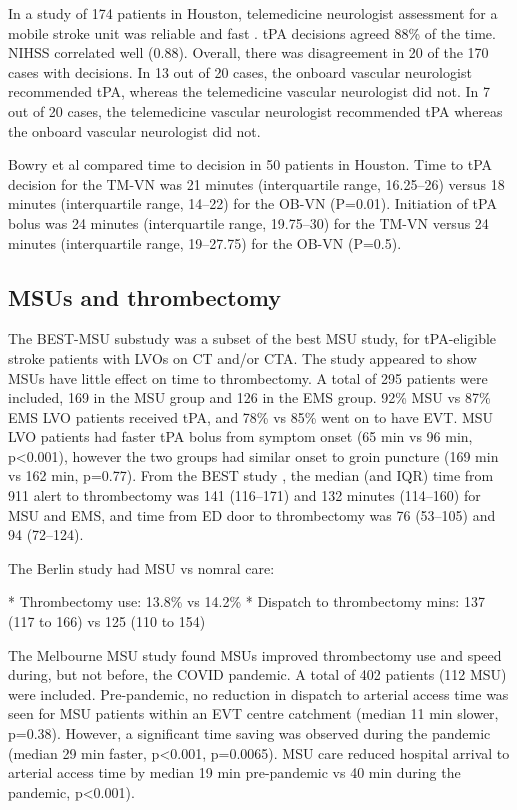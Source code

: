 In a study of 174 patients in Houston, telemedicine neurologist assessment for a mobile stroke unit was reliable and fast \cite{wu_telemedicine_2017} . tPA decisions agreed 88\% of the time. NIHSS correlated well (0.88). Overall, there was disagreement in 20 of the 170 cases with decisions. In 13 out of 20 cases, the onboard vascular neurologist recommended tPA, whereas the telemedicine vascular neurologist did not. In 7 out of 20 cases, the telemedicine vascular neurologist recommended tPA whereas the onboard vascular neurologist did not. 

Bowry et al \cite{bowry_time_2018} compared time to decision in 50 patients in Houston. Time to tPA decision for the TM-VN was 21 minutes (interquartile range, 16.25–26) versus 18 minutes (interquartile range, 14–22) for the OB-VN (P=0.01). Initiation of tPA bolus was 24 minutes (interquartile range, 19.75–30) for the TM-VN versus 24 minutes (interquartile range, 19–27.75) for the OB-VN (P=0.5).


\subsection{MSUs and thrombectomy}

The BEST-MSU substudy \cite{czap_abstract_2022} was a subset of the best MSU study, for tPA-eligible stroke patients with LVOs on CT and/or CTA. The study appeared to show MSUs have little effect on time to thrombectomy. A total of 295 patients were included, 169 in the MSU group and 126 in the EMS group. 92\% MSU vs 87\% EMS LVO patients received tPA, and 78\% vs 85\% went on to have EVT. MSU LVO patients had faster tPA bolus from symptom onset (65 min vs 96 min, p<0.001), however the two groups had similar onset to groin puncture (169 min vs 162 min, p=0.77). From the BEST study \cite{grotta_prospective_2021}, the median (and IQR) time from 911 alert to  thrombectomy was 141 (116–171) and 132 minutes (114–160) for MSU and EMS, and  time from ED door to thrombectomy was 76 (53–105) and 94 (72–124).

The Berlin study \cite{ebinger_association_2021} had MSU vs nomral care:

* Thrombectomy use: 13.8\% vs 14.2\%
* Dispatch to thrombectomy mins: 137 (117 to 166) vs 125 (110 to 154)


The Melbourne MSU study \cite{menezes_abstract_2023} found MSUs improved thrombectomy use and speed during, but not before, the COVID pandemic. A total of 402 patients (112 MSU) were included. Pre-pandemic, no reduction in dispatch to arterial access time was seen for MSU patients within an EVT centre catchment (median 11 min slower, p=0.38). However, a significant time saving was observed during the pandemic (median 29 min faster, p<0.001, p=0.0065). MSU care reduced hospital arrival to arterial access time by median 19 min pre-pandemic vs 40 min during the pandemic, p<0.001).

